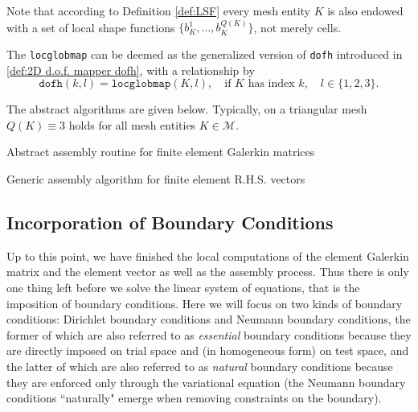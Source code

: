 	Note that according to Definition \ref{def:LSF} every mesh entity 
	$K$ is also endowed with a set of local shape functions 
	$\{b_K^1,...,b_K^{Q(K)}\}$, not merely cells.
	
	The \texttt{locglobmap} can be deemed as the generalized version of
	\texttt{dofh} introduced in \eqref{def:2D d.o.f. mapper dofh}, with
	a relationship by
	\[\texttt{dofh}(k,l)=\texttt{locglobmap}(K,l),\quad
		\textrm{if $K$ has index $k$},	\quad l\in\{1, 2, 3\}.\] 
	
	The abstract algorithms are given below. Typically, on a triangular mesh 
	$Q(K)\equiv3$ holds for all mesh entities $K\in\mathcal{M}$.
	\begin{algorithm}[!htbp]
		\caption{Abstract assembly routine for finite element Galerkin matrices}
		\label{alg:assembleGalerkinMatrix}
		
	\end{algorithm}
	
	\begin{algorithm}[!htbp]
		\caption{Generic assembly algorithm for finite element R.H.S. vectors}
		\label{alg:assembleRhsVector}
		
	\end{algorithm}
	
	\subsection{Incorporation of Boundary Conditions}
	Up to this point, we have finished the local computations of the element 
	Galerkin matrix and the element vector as well as the assembly process.
	Thus there is only one thing left before we solve the linear system of 
	equations, that is the imposition of boundary conditions. Here we will 
	focus on two kinds of boundary conditions: Dirichlet boundary conditions
	and Neumann boundary conditions, the former of which are also referred to 
	as \emph{essential} boundary conditions because they are directly imposed 
	on trial space and (in homogeneous form) on test space, and the latter of
	which are also referred to as \emph{natural} boundary conditions because 
	they are enforced only through the variational equation (the Neumann 
	boundary conditions ``naturally" emerge when removing constraints on the 
	boundary).
	
